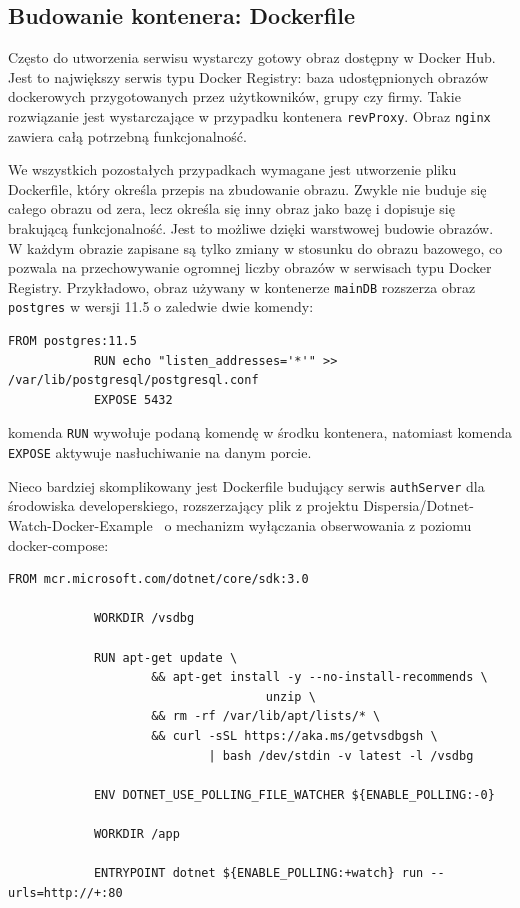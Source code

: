 	\subsection{Budowanie kontenera: Dockerfile}
	\label{sec:Dockerfile}

		Często do utworzenia serwisu wystarczy gotowy obraz dostępny w Docker Hub.
		Jest to największy serwis typu Docker Registry: baza udostępnionych obrazów dockerowych przygotowanych przez użytkowników, grupy czy firmy.
		Takie rozwiązanie jest wystarczające w przypadku kontenera \verb|revProxy|.
		Obraz \verb|nginx| zawiera całą potrzebną funkcjonalność.

		We wszystkich pozostałych przypadkach wymagane jest utworzenie pliku Dockerfile, który określa przepis na zbudowanie obrazu.
		Zwykle nie buduje się całego obrazu od zera, lecz określa się inny obraz jako bazę i dopisuje się brakującą funkcjonalność.
		Jest to możliwe dzięki warstwowej budowie obrazów.
		W każdym obrazie zapisane są tylko zmiany w stosunku do obrazu bazowego,
		co pozwala na przechowywanie ogromnej liczby obrazów w serwisach typu Docker Registry.
		Przykładowo, obraz używany w kontenerze \verb|mainDB| rozszerza obraz \verb|postgres| w wersji 11.5 o zaledwie dwie komendy:
		\begin{lstlisting}[label=lst:mainDB-Dockerfile]
			FROM postgres:11.5
			RUN echo "listen_addresses='*'" >> /var/lib/postgresql/postgresql.conf
			EXPOSE 5432
		\end{lstlisting}
		komenda \verb|RUN| wywołuje podaną komendę w środku kontenera, natomiast komenda \verb|EXPOSE| aktywuje nasłuchiwanie na danym porcie.

		Nieco bardziej skomplikowany jest Dockerfile budujący serwis \verb|authServer| dla środowiska developerskiego,
		rozszerzający plik z projektu Dispersia/Dotnet-Watch-Docker-Example~\cite{dotnetWatch} o mechanizm wyłączania obserwowania z poziomu docker-compose:
		\begin{lstlisting}[label=lst:dockerfile,caption=Plik Dockerfile dla środowiska developerskiego]
			FROM mcr.microsoft.com/dotnet/core/sdk:3.0

			WORKDIR /vsdbg
			
			RUN apt-get update \
					&& apt-get install -y --no-install-recommends \
									unzip \
					&& rm -rf /var/lib/apt/lists/* \
					&& curl -sSL https://aka.ms/getvsdbgsh \
							| bash /dev/stdin -v latest -l /vsdbg
			
			ENV DOTNET_USE_POLLING_FILE_WATCHER ${ENABLE_POLLING:-0}
			
			WORKDIR /app
			
			ENTRYPOINT dotnet ${ENABLE_POLLING:+watch} run --urls=http://+:80		
		\end{lstlisting}
		
